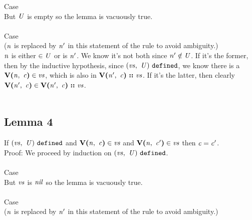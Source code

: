 \documentclass[12pt]{article}
\begin{document}
Case
\\

But $\mathit{U}$ is empty so the lemma is vacuously true.\\
\\

Case
\\
($\mathit{n}$ is replaced by $\mathit{n'}$ in this statement of the rule to avoid
ambiguity.)
\\

$\mathit{n}$ is either $\in \mathit{U}$ or is $\mathit{n'}$. We know it's not both
since $n' \notin \mathit{U}$. If it's the former, then by the inductive
hypothesis, since $(\mathit{vs},\ \mathit{U})\ \mathtt{defined}$, we know there is a
$\textbf{V(}\mathit{n},\ \mathit{c}\textbf{)} \in \mathit{vs}$, which is also in
$\textbf{V(}\mathit{n'},\ \mathit{c}\textbf{)}\ \textbf{::}\ \mathit{vs}$. If it's the latter, then
clearly $\textbf{V(}\mathit{n'},\ \mathit{c}\textbf{)} \in
\textbf{V(}\mathit{n'},\ \mathit{c}\textbf{)}\ \textbf{::}\ \mathit{vs}$.\\
\\

\subsection{Lemma 4}

If $(\mathit{vs},\ \mathit{U})\ \mathtt{defined}$ and $\textbf{V(}\mathit{n},\ \mathit{c}\textbf{)} \in
\mathit{vs}$ and $\textbf{V(}\mathit{n},\ \mathit{c'}\textbf{)} \in \mathit{vs}$ then $\mathit{c} =
\mathit{c'}$.\\

Proof: We proceed by induction on $(\mathit{vs},\ \mathit{U})\ \mathtt{defined}$.\\
\\

Case
\\

But $\mathit{vs}$ is $\mathit{nil}$ so the lemma is vacuously true.\\
\\

Case
\\
($\mathit{n}$ is replaced by $\mathit{n'}$ in this statement of the rule to avoid
ambiguity.)
\\
\end{document}
